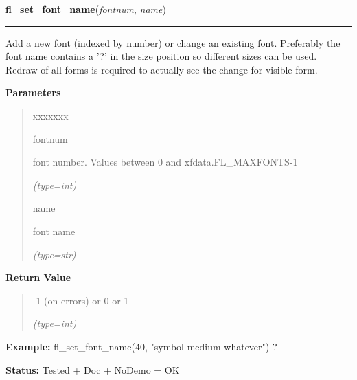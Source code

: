     \label{xformslib:flbasic:fl_set_font_name}

    \vspace{0.5ex}

\hspace{.8\funcindent}\begin{boxedminipage}{\funcwidth}

    \raggedright \textbf{fl\_set\_font\_name}(\textit{fontnum}, \textit{name})

    \vspace{-1.5ex}

    \rule{\textwidth}{0.5\fboxrule}
\setlength{\parskip}{2ex}
    Add a new font (indexed by number) or change an existing font. 
    Preferably the font name contains a '?' in the size position so 
    different sizes can be used. Redraw of all forms is required to 
    actually see the change for visible form.

\setlength{\parskip}{1ex}
      \textbf{Parameters}
      \vspace{-1ex}

      \begin{quote}
        \begin{Ventry}{xxxxxxx}

          \item[fontnum]

          font number. Values between 0 and xfdata.FL\_MAXFONTS-1

            {\it (type=int)}

          \item[name]

          font name

            {\it (type=str)}

        \end{Ventry}

      \end{quote}

      \textbf{Return Value}
    \vspace{-1ex}

      \begin{quote}
      -1 (on errors) or 0 or 1

      {\it (type=int)}

      \end{quote}

\textbf{Example:} fl\_set\_font\_name(40, "symbol-medium-whatever") ?



\textbf{Status:} Tested + Doc + NoDemo = OK



    \end{boxedminipage}

